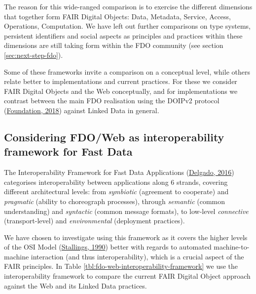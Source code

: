 The reason for this wide-ranged comparison is to exercise the different dimensions that together form FAIR Digital Objects: Data, Metadata, Service, Access, Operations, Computation.
We have left out further comparisons on type systems, persistent identifiers and social aspects as principles and practices within these dimensions are still taking form within the FDO community (see section \ref{sec:next-step-fdo}).

Some of these frameworks invite a comparison on a conceptual level, while others relate better to implementations and current practices. For these we consider FAIR Digital Objects and the Web conceptually, and for implementations we contrast between the main FDO realisation using the DOIPv2 protocol (\protect\hyperlink{ref-13TcbsZF6}{Foundation, 2018}) against Linked Data in general.

\hypertarget{sec:interoperability-compare}{%
\subsection{Considering FDO/Web as interoperability framework for Fast Data}\label{sec:interoperability-compare}}

The Interoperability Framework for Fast Data Applications (\protect\hyperlink{ref-KlCFFFyL}{Delgado, 2016}) categorises interoperability between applications along 6 strands, covering different architectural levels: from \emph{symbiotic} (agreement to cooperate) and \emph{pragmatic} (ability to choreograph processes), through \emph{semantic} (common understanding) and \emph{syntactic} (common message formats), to low-level \emph{connective} (transport-level) and \emph{environmental} (deployment practices).

We have chosen to investigate using this framework as it covers the higher levels of the OSI Model (\protect\hyperlink{ref-8ZRGFa6y}{Stallings, 1990}) better with regards to automated machine-to-machine interaction (and thus interoperability), which is a crucial aspect of the FAIR principles. In Table \ref{tbl:fdo-web-interoperability-framework} we use the interoperability framework to compare the current FAIR Digital Object approach against the Web and its Linked Data practices.

